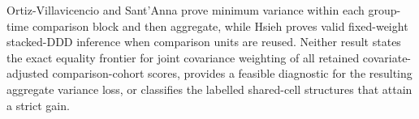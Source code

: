 Ortiz-Villavicencio and Sant'Anna prove minimum variance within each group-time comparison block and then aggregate, while Hsieh proves valid fixed-weight stacked-DDD inference when comparison units are reused. Neither result states the exact equality frontier for joint covariance weighting of all retained covariate-adjusted comparison-cohort scores, provides a feasible diagnostic for the resulting aggregate variance loss, or classifies the labelled shared-cell structures that attain a strict gain.